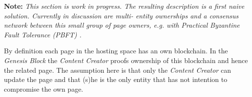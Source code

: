 
\textbf{Note:} \textit{This section is work in progress. The resulting
description is a first naive solution. Currently in discussion are multi-
entity ownerships and a consensus network between this small group of page
owners, e.g. with Practical Byzantine Fault Tolerance (PBFT)
\cite{castro1999practical}.}

By definition each page in the hosting space has an own blockchain. In the
\textit{Genesis Block} the \textit{Content Creator} proofs ownership of this
blockchain and hence the related page. The assumption here is that only the
\textit{Content Creator} can update the page and that (s)he is the only entity
that has not intention to compromise the own page.
